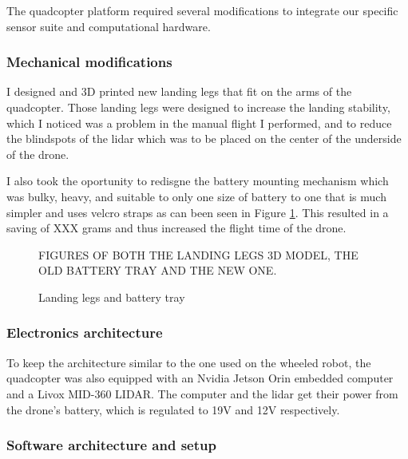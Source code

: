 \documentclass[11pt]{article}
\begin{document}
                The quadcopter platform required several modifications to integrate our specific sensor suite and computational hardware.

                \subsubsection{Mechanical modifications}

                    I designed and 3D printed new landing legs that fit on the arms of the quadcopter. Those landing legs were designed to increase the landing stability, which I noticed was a problem in the manual flight I performed, and to reduce the blindspots of the lidar which was to be placed on the center of the underside of the drone.

                    I also took the oportunity to redisgne the battery mounting mechanism which was bulky, heavy, and suitable to only one size of battery to one that is much simpler and uses velcro straps as can been seen in Figure \ref{fig:landing_legs}. This resulted in a saving of \color{red} XXX grams \color{black} and thus increased the flight time of the drone. 
                    

                    \begin{figure}[H]
                        \centering
                        FIGURES OF BOTH THE LANDING LEGS 3D MODEL, THE OLD BATTERY TRAY AND THE NEW ONE.
                        \caption{Landing legs and battery tray}
                        \label{fig:landing_legs}
                    \end{figure}    
                \subsubsection{Electronics architecture}
    

                    To keep the architecture similar to the one used on the wheeled robot, the quadcopter was also equipped with an Nvidia Jetson Orin embedded computer and a Livox MID-360 LIDAR. The computer and the lidar get their power from the drone's battery, which is regulated to 19V and 12V respectively.

                \subsubsection{Software architecture and setup}
                    
\end{document}
